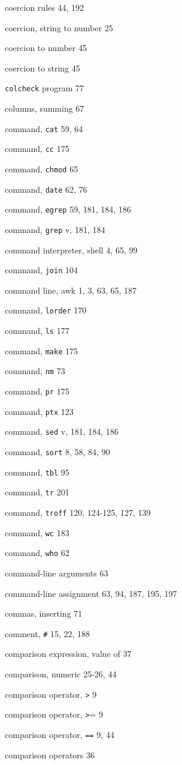 \begin{multicols}{3}
coercion rules 44, 192

coercion, string to number 25

coercion to number 45

coercion to string 45

\verb'colcheck' program 77

columns, summing 67

command, \verb'cat' 59, 64

command, \verb'cc' 175

command, \verb'chmod' 65

command, \verb'date' 62, 76

command, \verb'egrep' 59, 181, 184, 186

command, \verb'grep' v, 181, 184

command interpreter, shell 4, 65, 99

command, \verb'join' 104

command line, awk 1, 3, 63, 65, 187

command, \verb'lorder' 170

command, \verb'ls' 177

command, \verb'make' 175

command, \verb'nm' 73

command, \verb'pr' 175

command, \verb'ptx' 123

command, \verb'sed' v, 181, 184, 186

command, \verb'sort' 8, 58, 84, 90

command, \verb'tbl' 95

command, \verb'tr' 201

command, \verb'troff' 120, 124-125, 127, 139

command, \verb'wc' 183

command, \verb'who' 62

command-line arguments 63

command-line assignment 63, 94, 187, 195, 197

commas, inserting 71

comment, \verb'#' 15, 22, 188

comparison expression, value of 37

comparison, numeric 25-26, 44

comparison operator, \verb'>' 9

comparison operator, \verb'>'= 9

comparison operator, \verb'==' 9, 44

comparison operators 36


\end{multicols}
